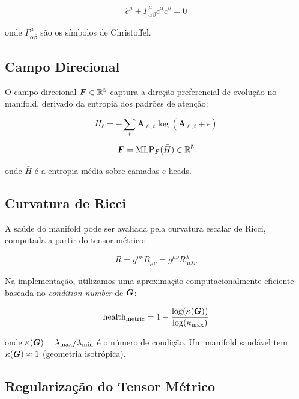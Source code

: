 \begin{equation}
    \ddot{c}^\mu + \Gamma^\mu_{\alpha\beta} \dot{c}^\alpha \dot{c}^\beta = 0
\end{equation}

onde $\Gamma^\mu_{\alpha\beta}$ s\~ao os s\'imbolos de Christoffel.

\subsection{Campo Direcional}

O campo direcional $\bm{F} \in \mathbb{R}^5$ captura a dire\c{c}\~ao preferencial de
evolu\c{c}\~ao no manifold, derivado da entropia dos padr\~oes de aten\c{c}\~ao:

\begin{equation}
    H_\ell = -\sum_t \bm{A}_{\ell,t} \log(\bm{A}_{\ell,t} + \epsilon)
\end{equation}

\begin{equation}
    \bm{F} = \text{MLP}_F(\bar{H}) \in \mathbb{R}^5
\end{equation}

onde $\bar{H}$ \'e a entropia m\'edia sobre camadas e heads.

\subsection{Curvatura de Ricci}

A sa\'ude do manifold pode ser avaliada pela curvatura escalar de Ricci,
computada a partir do tensor m\'etrico:

\begin{equation}
    R = g^{\mu\nu} R_{\mu\nu} = g^{\mu\nu} R^\lambda_{\ \mu\lambda\nu}
\end{equation}

Na implementa\c{c}\~ao, utilizamos uma aproxima\c{c}\~ao computacionalmente
eficiente baseada no \textit{condition number} de $\bm{G}$:

\begin{equation}
    \text{health}_{\text{metric}} = 1 - \frac{\log(\kappa(\bm{G}))}{\log(\kappa_{\max})}
\end{equation}

onde $\kappa(\bm{G}) = \lambda_{\max} / \lambda_{\min}$ \'e o n\'umero de
condi\c{c}\~ao. Um manifold saud\'avel tem $\kappa(\bm{G}) \approx 1$
(geometria isotr\'opica).

\subsection{Regulariza\c{c}\~ao do Tensor M\'etrico}

